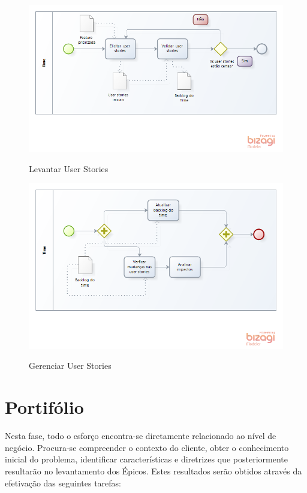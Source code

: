 \FloatBarrier
\begin{figure}[!htpd]
		\centering
		\includegraphics[scale=0.7]{figuras/usPRI}
		\label{img:time}
		\caption{Levantar User Stories}
\end{figure}
\FloatBarrier

\FloatBarrier
\begin{figure}[!htpd]
		\centering
		\includegraphics[scale=0.7]{figuras/usGRE}
		\label{img:time}
		\caption{Gerenciar User Stories}
\end{figure}
\FloatBarrier

\section {Portifólio}

Nesta fase, todo o esforço encontra-se diretamente relacionado ao nível de negócio. Procura-se compreender o contexto do cliente, obter o conhecimento inicial do problema, identificar características e diretrizes que posteriormente  resultarão no levantamento dos Épicos.  Estes resultados serão obtidos através da efetivação das seguintes tarefas:

